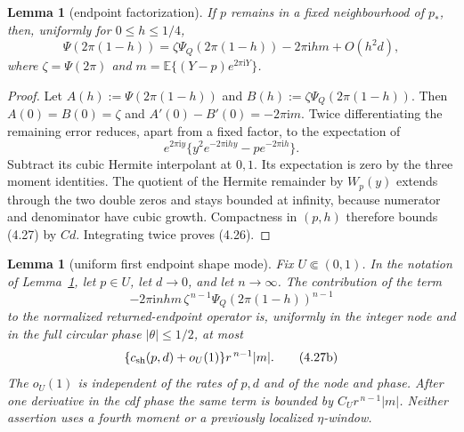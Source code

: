 \documentclass[11pt,a4paper]{article}
\numberwithin{equation}{section}
\newtheorem{lemma}[theorem]{Lemma}
\theoremstyle{definition}
\theoremstyle{remark}
\newcommand{\E}{\mathbb E}
\newcommand{\ii}{\mathrm i}
\begin{document}
\begin{lemma}[endpoint factorization]\label{orig:lem:endfactor}
If $p$ remains in a fixed neighbourhood of $p_*$, then, uniformly for
$0\le h\le1/4$,
\[
 \Psi(2\pi(1-h))
 =\zeta\Psi_Q(2\pi(1-h))-2\pi\ii hm+O(h^2d),           \tag{4.26}
\]
where $\zeta=\Psi(2\pi)$ and
$m=\E\{(Y-p)e^{2\pi\ii Y}\}$.
\end{lemma}

\begin{proof}
Let $A(h):=\Psi(2\pi(1-h))$ and
$B(h):=\zeta\Psi_Q(2\pi(1-h))$.  Then
$A(0)=B(0)=\zeta$ and
$A'(0)-B'(0)=-2\pi\ii m$.  Twice differentiating the remaining error
reduces, apart from a fixed factor, to the expectation of
\[
 e^{2\pi\ii y}\{y^2e^{-2\pi\ii hy}-pe^{-2\pi\ii h}\}. \tag{4.27}
\]
Subtract its cubic Hermite interpolant at $0,1$.  Its expectation is zero
by the three moment identities.  The quotient of the Hermite remainder by
$W_p(y)$ extends through the two double zeros and stays bounded at infinity,
because numerator and denominator have cubic growth.  Compactness in
$(p,h)$ therefore bounds (4.27) by $Cd$.  Integrating twice proves (4.26).
\end{proof}

\begin{lemma}[uniform first endpoint shape mode]\label{orig:lem:endshape}
Fix $U\Subset(0,1)$.  In the notation of
Lemma~\ref{orig:lem:endfactor}, let $p\in U$, let $d\to0$, and let $n\to\infty$.
The contribution of the term
\[
 -2\pi\ii nhm\,\zeta^{\,n-1}
       \Psi_Q(2\pi(1-h))^{n-1}                         \tag{4.27a}
\]
to the normalized returned-endpoint operator is, uniformly in the integer
node and in the full circular phase $|\theta|\le1/2$, at most
\[
 \{c_{\rm sh}(p,d)+o_U(1)\}r^{\,n-1}|m|.             \tag{4.27b}
\]
The $o_U(1)$ is independent of the rates of $p,d$ and of the node and
phase.  After one derivative in the cdf phase the same term is bounded by
$C_Ur^{\,n-1}|m|$.  Neither assertion uses a fourth moment or a previously
localized $\eta$-window.
\end{lemma}
\end{document}

